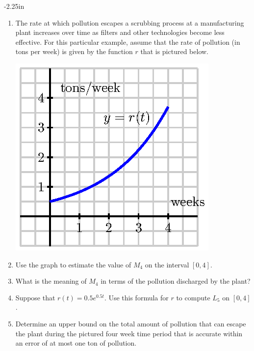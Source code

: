 \begin{adjustwidth*}{}{-2.25in}
\begin{multicols*}{2}
\begin{enumerate}[1),start=39]
	\item The rate at which pollution escapes a scrubbing process at a manufacturing plant increases over time as filters and other technologies become less effective.  For this particular example, assume that the rate of pollution (in tons per week) is given by the function $r$ that is pictured below.
\begin{center}
\includegraphics[scale=.75]{figures/4_2_Ez4.eps}
\end{center}
	\ba
		\item Use the graph to estimate the value of $M_4$ on the interval $[0,4]$.
		\item What is the meaning of $M_4$ in terms of the pollution discharged by the plant?
		\item Suppose that $r(t) = 0.5 e^{0.5t}$.  Use this formula for $r$ to compute $L_5$ on $[0,4]$.  
		\item Determine an upper bound on the total amount of pollution that can escape the plant during the pictured four week time period that is accurate within an error of at most one ton of pollution.
	\ea
\end{enumerate}

\end{multicols*}
\end{adjustwidth*}

\afterexercises